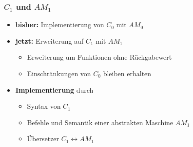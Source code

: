 \documentclass[aspectratio=1610,onlymath, ngerman]{beamer}
\renewcommand{\emph}[1]{\textbf{#1}}
\begin{document}
    \maketitle
    
    \begin{frame} \frametitle{$C_1$ und $AM_1$}
    \small
    	\begin{itemize}
    		\item \emph{bisher:} Implementierung von $C_0$ mit $AM_0$
    		\item \emph{jetzt:} Erweiterung auf $C_1$ mit $AM_1$ \pause
    			\begin{itemize}
    				\item Erweiterung um Funktionen ohne Rückgabewert
    				\item Einschränkungen von $C_0$ bleiben erhalten
    			\end{itemize}
    		\pause
    		\item \emph{Implementierung} durch
    			\begin{itemize}
    				\item Syntax von $C_1$
    				\item Befehle und Semantik einer abstrakten Maschine $AM_1$
    				\item Übersetzer $C_1 \leftrightarrow AM_1$
    			\end{itemize}
    	\end{itemize}
    \end{frame}
\end{document}
